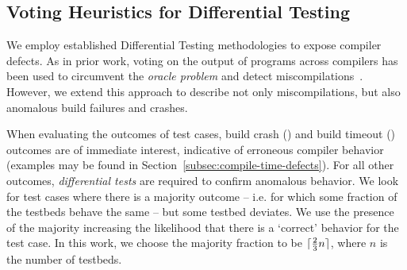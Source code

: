 \subsection{Voting Heuristics for Differential Testing}

We employ established Differential Testing methodologies to expose compiler defects. As in prior work, voting on the output of programs across compilers has been used to circumvent the \emph{oracle problem} and detect miscompilations~\cite{McKeeman1998}. However, we extend this approach to describe not only miscompilations, but also anomalous build failures and crashes.


%

\begin{table}[t!]
	\footnotesize %
	\centering %
	
	\caption{%
		OpenCL systems and the number of bug reports submitted to date. For each system, two testbeds are created, one with compiler optimizations, the other without.%
		\vspace{-.5em}
	}
  \vspace{-1.8em}
	\label{tab:platforms}
\end{table}

When evaluating the outcomes of test cases, build crash (\bc) and build timeout (\bto) outcomes are of immediate interest, indicative of erroneous compiler behavior (examples may be found in Section~\ref{subsec:compile-time-defects}). For all other outcomes, \emph{differential tests} are required to confirm anomalous behavior. We look for test cases where there is a majority outcome -- i.e. for which some fraction of the testbeds behave the same -- but some testbed deviates. We use the presence of the majority increasing the likelihood that there is a `correct' behavior for the test case. In this work, we choose the majority fraction to be $\lceil\frac{2}{3}n\rceil$, where $n$ is the number of testbeds.

